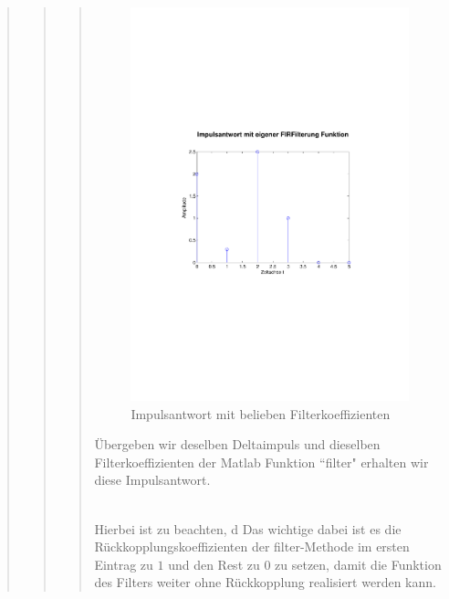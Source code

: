 \begin{quote}
\begin{quote}
\begin{quote}
			\begin{figure}[H]
		            \centering
		                \includegraphics[scale=0.5, trim = 1cm 6cm 1.5cm 8cm,
		                clip]{./Bilder/Impulsantwort_aufgabe1}
		                    \caption{Impulsantwort mit belieben Filterkoeffizienten}
		                    \label{fig:./Bilder/Impulsantwort_aufgabe1}
		            \end{figure}
		            
			Übergeben wir deselben Deltaimpuls und dieselben Filterkoeffizienten der Matlab Funktion ``filter" erhalten wir diese
			Impulsantwort.
			
			 \\
			Hierbei ist zu beachten, d
			Das wichtige dabei ist es die Rückkopplungskoeffizienten der filter-Methode im ersten Eintrag zu $1$ und den
			Rest zu $0$ zu setzen, damit die Funktion des Filters weiter ohne Rückkopplung
			realisiert werden kann.\\
			

\end{quote}
\end{quote}
\end{quote}
